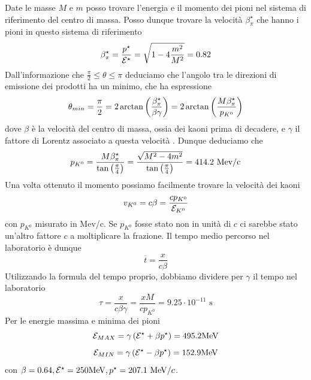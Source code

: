 \documentclass[12pt,twoside,a4]{article}
\begin{document}
\begin{solution}
Date le masse $M$ e $m$ posso trovare l'energia e il momento dei pioni nel sistema di riferimento del centro di massa. Posso dunque trovare la velocità  $\beta^\star_\pi$ che hanno i pioni in questo sistema di riferimento 
$$ \beta^\star_\pi = \frac{p^\star}{\mathcal{E}^\star} = \sqrt{1 - 4\frac{m^2}{M^2}} = 0.82$$
Dall'informazione che $\frac{\pi}{2} \leq \theta \leq \pi$ deduciamo che l'angolo tra le direzioni di emissione dei prodotti ha un minimo, che ha espressione
$$ \theta_{min} = \frac{\pi}{2} = 2 \arctan \left({\frac{\beta^\star_\pi}{\beta \gamma}}\right) = 2 \arctan \left({\frac{M \beta^\star_\pi}{p_{K^0}}}\right)$$
dove $\beta$ è la velocità  del centro di massa, ossia dei kaoni prima di decadere, e $\gamma$ il fattore di Lorentz associato a questa velocità . Dunque deduciamo che
$$ p_{K^0} = \frac{M \beta^\star_\pi}{\tan\left({\frac{\pi}{4}}\right)} = \frac{\sqrt{M^2 -4 m^2}}{\tan\left({\frac{\pi}{4}}\right)} = 414.2 \mbox{ Mev/c} $$
Una volta ottenuto il momento possiamo facilmente trovare la velocità  dei kaoni
$$ v_{K^0} = c \beta = \frac{c p_{K^0}}{\mathcal{E}_{K^0}}$$
con $p_{K^0}$ misurato in Mev/c. Se $p_{K^0}$ fosse stato non in unità  di $c$ ci sarebbe stato un'altro fattore $c$ a moltiplicare la frazione. Il tempo medio percorso nel laboratorio è dunque 
$$ \overline{t} = \frac{x}{c \beta} $$
Utilizzando la formula del tempo proprio, dobbiamo dividere per $\gamma$ il tempo nel laboratorio
$$ \tau  = \frac{x}{c \beta \gamma} = \frac{x M}{c p_{K^0}} = 9.25 \cdot 10^{-11} \mbox{ s}$$
Per le energie massima e minima dei pioni
$$ \mathcal{E}_{MAX} = \gamma \left({ \mathcal{E}^\star + \beta p^\star}\right) = 495.2 \mathrm{MeV}$$
$$ \mathcal{E}_{MIN} = \gamma \left({ \mathcal{E}^\star - \beta p^\star}\right) = 152.9 \mathrm{MeV}$$
con $\beta = 0.64, \mathcal{E}^\star = 250 \mathrm{MeV}, p^\star = 207.1 \ \mathrm{MeV}/c$.
\end{solution}
\end{document}
